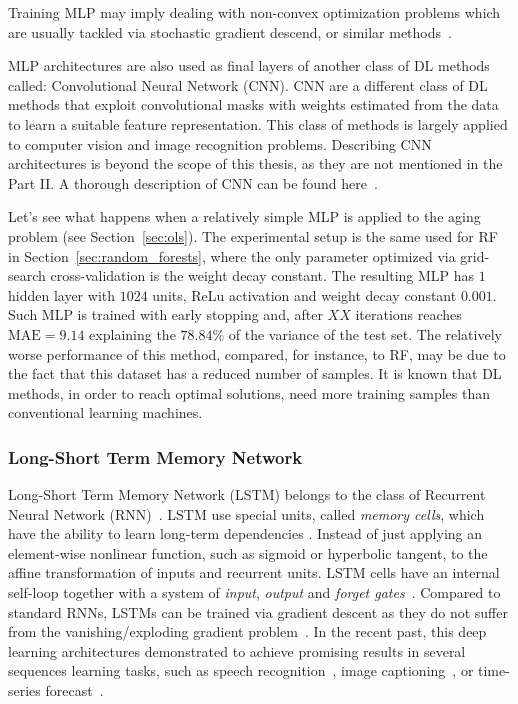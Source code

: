 	    Training MLP may imply dealing with non-convex optimization problems which are usually tackled via stochastic gradient descend, or similar methods~\cite{ruder2016overview, sra2012optimization}.

		MLP architectures are also used as final layers of another class of DL methods called: Convolutional Neural Network (\ac{CNN}).
		CNN are a different class of DL methods that exploit convolutional masks with weights estimated from the data to learn a suitable feature representation. This class of methods is largely applied to computer vision and image recognition problems.
		Describing CNN architectures is beyond the scope of this thesis, as they are not mentioned in the Part II. A thorough description of CNN can be found here~\cite{goodfellow2016deep}.

		Let's see what happens when a relatively simple MLP is applied to the aging problem (see Section~\ref{sec:ols}). The experimental setup is the same used for RF in Section~\ref{sec:random_forests}, where the only parameter optimized via grid-search cross-validation is the weight decay constant.
		The resulting MLP has $1$ hidden layer with $1024$ units, ReLu activation and weight decay constant $0.001$.
		Such MLP is trained with early stopping and, after $XX$ iterations reaches $\text{MAE} = 9.14$ explaining the $78.84\%$ of the variance of the test set.
		The relatively worse performance of this method, compared, for instance, to RF, may be due to the fact that this dataset has a reduced number of samples. It is known that DL methods, in order to reach optimal solutions, need more training samples than conventional learning machines.
		
		\subsubsection{Long-Short Term Memory Network} \label{sec:lstm}
		Long-Short Term Memory Network (LSTM) belongs to the class of Recurrent Neural Network (\ac{RNN})~\cite{goodfellow2016deep}.
		LSTM use special units, called {\sl memory cells}, which have the ability to learn long-term dependencies \cite{lecun2015deep}. 
		Instead of just applying an element-wise nonlinear function, such as sigmoid or hyperbolic tangent, to the affine transformation of inputs and recurrent units.
		LSTM cells have an internal self-loop together with a system of {\sl input}, {\sl output} and {\sl forget gates}~\cite{goodfellow2016deep}.
		Compared to standard RNNs, LSTMs can be trained via gradient descent as they do not suffer from the vanishing/exploding gradient problem~\cite{bengio1994learning}.
		In the recent past, this deep learning architectures demonstrated to achieve promising results in several sequences learning tasks, such as speech recognition~\cite{graves2005framewise}, image captioning~\cite{vinyals2015show}, or time-series forecast~\cite{schmidhuber2005evolino}. 
		
